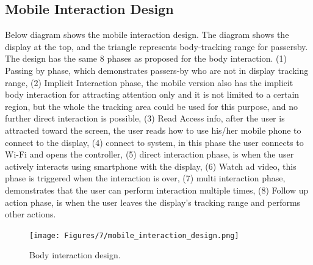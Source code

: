 \subsection{Mobile Interaction Design}
Below diagram shows the mobile interaction design. The diagram shows the display at the top, and the triangle represents body-tracking range for passersby. The design has the same 8 phases as proposed for the body interaction. (1) Passing by phase, which demonstrates passers-by who are not in display tracking range, (2) Implicit Interaction phase, the mobile version also has the implicit body interaction for attracting attention only and it is not limited to a certain region, but the whole the tracking area could be used for this purpose, and no further direct interaction is possible, (3) Read Access info, after the user is attracted toward the screen, the user reads how to use his/her mobile phone to connect to the display, (4) connect to system, in this phase the user connects to Wi-Fi and opens the controller, (5) direct interaction phase, is when the user actively interacts using smartphone with the display, (6) Watch ad video, this phase is triggered when the interaction is over, (7) multi interaction phase, demonstrates that the user can perform interaction multiple times, (8) Follow up action phase, is when the user leaves the display’s tracking range and performs other actions.

\begin{figure}[H]
    \centering
    \texttt{[image: Figures/7/mobile\_interaction\_design.png]}
    \caption{Body interaction design.}%
    \label{fig:body_interaction_deisng}%
\end{figure}


